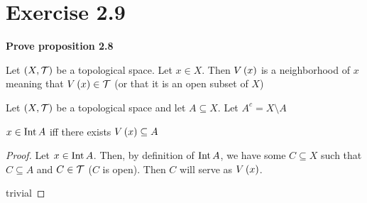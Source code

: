 \documentclass{article}
\begin{document}
\section{Exercise 2.9}

\textbf{Prove proposition 2.8}

\begin{notation}
    \label{def:nbhd}
    Let $(X, \mathcal{T})$ be a topological space. Let $x \in X$. Then $V\left(x\right)$ is a neighborhood
    of $x$ meaning that $V\left(x\right) \in \mathcal{T}$ (or that it is an open subset of $X$)
\end{notation}

Let $(X, \mathcal{T})$ be a topological space and let $A \subseteq X$. Let $A^c = X \setminus A$

\begin{proposition}
\label{book:prop:2.8a}
    $x \in \textnormal{Int} \, A$ iff there exists $V\left(x\right) \subseteq A$
\end{proposition}
\begin{proof}
    \forwarddir Let $x \in \textnormal{Int} \, A$. Then, by definition of $\textnormal{Int} \, A$, we have some
    $C \subseteq X$ such that $C \subseteq A$ and $C \in \mathcal{T}$ ($C$ is open). Then $C$ will
    serve as $V\left(x\right)$.

    \conversedir trivial
\end{proof}
\end{document}
